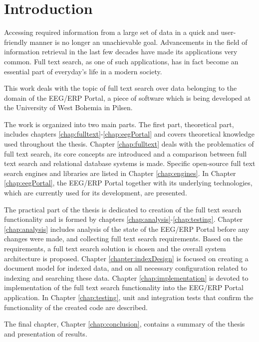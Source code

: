 
\chapter{Introduction}

Accessing required information from a large set of data in a quick and user-friendly manner is no longer an unachievable goal. 
Advancements in the field of information retrieval in the last few decades have made its applications 
very common.
Full text search, as one of such applications, has in fact become an essential part of everyday's life in a modern society.

This work deals with the topic of full text search over data belonging to the domain of the EEG/ERP Portal, a piece of software which is being developed at the University of West Bohemia in Pilsen. 

The work is organized into two main parts.
The first part, theoretical part, includes chapters \ref{chap:fulltext}-\ref{chap:eegPortal} and covers theoretical knowledge used throughout the thesis. 
Chapter \ref{chap:fulltext} deals with the problematics of full text search, its core concepts are introduced and a comparison between full text search and relational database systems is made.
Specific open-source full text search engines and libraries are listed in Chapter \ref{chap:engines}.
In Chapter \ref{chap:eegPortal}, the EEG/ERP Portal together with its underlying technologies, which are currently used for its development, are presented. 

The practical part of the thesis is dedicated to creation of the full text search functionality and is formed by chapters \ref{chap:analysis}-\ref{chap:testing}.
Chapter \ref{chap:analysis} includes analysis of the state of the EEG/ERP Portal before any changes were made, and collecting full text search requirements. 
Based on the requirements, a full text search solution is chosen and the overall system architecture is proposed.
Chapter \ref{chapter:indexDesign} is focused on creating a document model for indexed data, and on all necessary configuration related to indexing and searching these data.
Chapter \ref{chap:implementation} is devoted to implementation of the full text search functionality into the EEG/ERP Portal application.
In Chapter \ref{chap:testing}, unit and integration tests that confirm the functionality of the created code are described.


The final chapter, Chapter \ref{chap:conclusion}, contains a summary of the thesis and presentation of results.